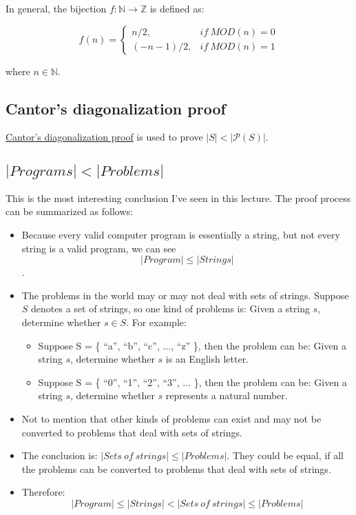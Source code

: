 \documentclass[12pt, letterpaper, oneside]{book}
\begin{document}
In general, the bijection $f: \mathbb{N} \rightarrow \mathbb{Z}$ is defined as:

\[
  f(n) = \begin{cases}
    n / 2,        & if \ MOD(n) = 0 \\
    (-n - 1) / 2, & if \ MOD(n) = 1
  \end{cases}
\]

where $n \in \mathbb{N}$.

\subsection{Cantor's diagonalization proof}

\href{https://en.wikipedia.org/wiki/Cantor%27s_diagonal_argument}{Cantor's
  diagonalization proof} is used to prove $|S| < |\mathcal{P}(S)|$.

\subsection{$|Programs| < |Problems|$}

This is the most interesting conclusion I've seen in this lecture. The proof
process can be summarized as follows:
\begin{itemize}
  \item Because every valid computer program is essentially a string, but not
        every string is a valid program, we can see \[|Program| \leq |Strings|\].
  \item The problems in the world may or may not deal with sets of strings.
        Suppose $S$ denotes a set of strings, so one kind of problems is: Given a
        string $s$, determine whether $s \in S$. For example:
        \begin{itemize}
          \item Suppose S = \{ ``a'', ``b'', ``c'', $\ldots$, ``z'' \}, then the
                problem can be: Given a string $s$, determine whether $s$ is an English
                letter.
          \item Suppose S = \{ ``0'', ``1'', ``2'', ``3'', $\ldots$ \}, then the
                problem can be: Given a string $s$, determine whether $s$ represents a
                natural number.
        \end{itemize}
  \item Not to mention that other kinds of problems can exist and may not be
        converted to problems that deal with sets of strings.
  \item The conclusion is: $|Sets\ of\ strings| \leq |Problems|$. They could be
        equal, if all the problems can be converted to problems that deal with sets
        of strings.
  \item Therefore:
        \[|Program| \leq |Strings| < |Sets\ of\ strings| \leq |Problems|\]
\end{itemize}
\end{document}
